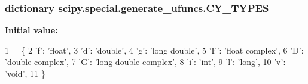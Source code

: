 \subsubsection[{C\+Y\+\_\+\+T\+Y\+P\+E\+S}]{\setlength{\rightskip}{0pt plus 5cm}dictionary scipy.\+special.\+generate\+\_\+ufuncs.\+C\+Y\+\_\+\+T\+Y\+P\+E\+S}\label{namespacescipy_1_1special_1_1generate__ufuncs_a01863edc87085deb106b5ccc3e5ef3ef}
{\bfseries Initial value\+:}
\begin{DoxyCode}
1 = \{
2     \textcolor{stringliteral}{'f'}: \textcolor{stringliteral}{'float'},
3     \textcolor{stringliteral}{'d'}: \textcolor{stringliteral}{'double'},
4     \textcolor{stringliteral}{'g'}: \textcolor{stringliteral}{'long double'},
5     \textcolor{stringliteral}{'F'}: \textcolor{stringliteral}{'float complex'},
6     \textcolor{stringliteral}{'D'}: \textcolor{stringliteral}{'double complex'},
7     \textcolor{stringliteral}{'G'}: \textcolor{stringliteral}{'long double complex'},
8     \textcolor{stringliteral}{'i'}: \textcolor{stringliteral}{'int'},
9     \textcolor{stringliteral}{'l'}: \textcolor{stringliteral}{'long'},
10     \textcolor{stringliteral}{'v'}: \textcolor{stringliteral}{'void'},
11 \}
\end{DoxyCode}
\hypertarget{namespacescipy_1_1special_1_1generate__ufuncs_ae07e024ca78866d3cc371ee3cf76f549}{}
